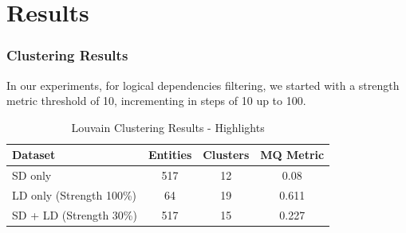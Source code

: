 \documentclass{beamer}
\begin{document}
\section{Results}

\begin{frame}
\frametitle{Clustering Results}

In our experiments, for logical dependencies filtering, we started with a strength metric threshold of 10, incrementing in steps of 10 up to 100.
\begin{center}
    \begin{table}
    \centering
    \caption{Louvain Clustering Results - Highlights}
    \begin{tabular}{lccc}
        \toprule
        \textbf{Dataset} & \textbf{Entities} & \textbf{Clusters} & \textbf{MQ Metric} \\
        \midrule
        SD only & 517 & 12 & 0.08 \\
        LD only (Strength 100\%) & 64 & 19 & 0.611 \\
        SD + LD (Strength 30\%) & 517 & 15 & 0.227 \\
        \bottomrule
    \end{tabular}
    \end{table}
\end{center}
\end{frame}
\end{document}
